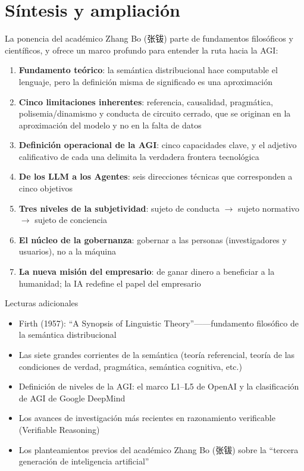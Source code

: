 \section{Síntesis y ampliación}

La ponencia del académico Zhang Bo (张钹) parte de fundamentos filosóficos y científicos, y ofrece un marco profundo para entender la ruta hacia la AGI:

\begin{enumerate}
\item \textbf{Fundamento teórico}: la semántica distribucional hace computable el lenguaje, pero la definición misma de significado es una aproximación
\item \textbf{Cinco limitaciones inherentes}: referencia, causalidad, pragmática, polisemia/dinamismo y conducta de circuito cerrado, que se originan en la aproximación del modelo y no en la falta de datos
\item \textbf{Definición operacional de la AGI}: cinco capacidades clave, y el adjetivo calificativo de cada una delimita la verdadera frontera tecnológica
\item \textbf{De los LLM a los Agentes}: seis direcciones técnicas que corresponden a cinco objetivos
\item \textbf{Tres niveles de la subjetividad}: sujeto de conducta $\rightarrow$ sujeto normativo $\rightarrow$ sujeto de conciencia
\item \textbf{El núcleo de la gobernanza}: gobernar a las personas (investigadores y usuarios), no a la máquina
\item \textbf{La nueva misión del empresario}: de ganar dinero a beneficiar a la humanidad; la IA redefine el papel del empresario
\end{enumerate}

\begin{knowledgebox}{Lecturas adicionales}
\begin{itemize}
\item Firth (1957): ``A Synopsis of Linguistic Theory''——fundamento filosófico de la semántica distribucional
\item Las siete grandes corrientes de la semántica (teoría referencial, teoría de las condiciones de verdad, pragmática, semántica cognitiva, etc.)
\item Definición de niveles de la AGI: el marco L1--L5 de OpenAI y la clasificación de AGI de Google DeepMind
\item Los avances de investigación más recientes en razonamiento verificable (Verifiable Reasoning)
\item Los planteamientos previos del académico Zhang Bo (张钹) sobre la ``tercera generación de inteligencia artificial''
\end{itemize}
\end{knowledgebox}




